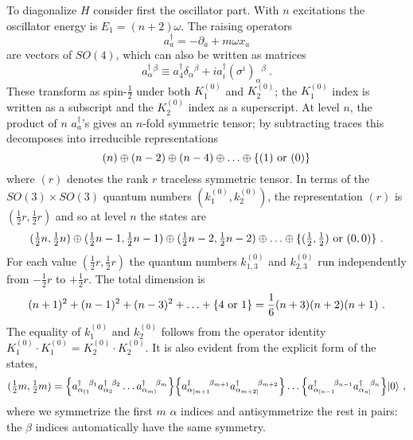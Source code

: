 \documentclass[a4paper,12pt]{article}
\newcommand{\half}{{\textstyle \frac{1}{2}}}
\begin{document}
To diagonalize $H$ consider first the oscillator part.  With $n$
excitations the oscillator energy is $E_1 = (n+2)\omega$.  The raising
operators
\begin{equation}
a_a^\dagger = -\partial_a + m\omega x_a
\end{equation}
are vectors of $SO(4)$, which can also be written as matrices
\begin{equation}
a^\dagger_{\alpha}\!^{\beta} \equiv a_4^\dagger
\delta_{\alpha}{}^{\beta} + i a_i^\dagger
(\sigma^i)_{\alpha}{}^{\beta}\ .
\end{equation}
These transform as spin-$\frac{1}{2}$ under both $K_1^{(0)}$ and
$K_2^{(0)}$; the $K_1^{(0)}$ index is written as a subscript and the
$K_2^{(0)}$ index as a superscript.  At level $n$, the product of $n$
$a_a^\dagger$'s gives an
$n$-fold symmetric tensor; by subtracting traces this  decomposes into
irreducible representations
\begin{equation}
(n) \oplus (n-2) \oplus (n-4) \oplus  \ldots \oplus \{ (1)\ {\rm or}\ (0)
\}
\end{equation}
where $(r)$ denotes the rank $r$ traceless symmetric tensor.  In terms of
the $SO(3) \times SO(3)$ quantum numbers $(k_1^{(0)}, k_2^{(0)})$, the
representation $(r)$ is $(\frac{1}{2}r,\frac{1}{2}r)$ and so at level $n$
the states are
\begin{equation}
(\half{n},\half{n}) \oplus
(\half{n}-1,\half{n}-1)\oplus
(\half{n}-2,\half{n}-2)\oplus
 \ldots \oplus
\{ 
(\half,\half)\ {\rm or}\ (0,0) \}\ .
\end{equation}
For each value $(\frac{1}{2}r,\frac{1}{2}r)$ the quantum numbers
$k^{(0)}_{1,3}$ and $k^{(0)}_{2,3}$ run independently from
$-\frac{1}{2}r$ to $+\frac{1}{2}r$.  The total dimension is
\begin{equation}
(n+1)^2 + (n-1)^2 + (n-3)^2 + \ldots + \{ 4\ {\rm or}\ 1\} =
\frac{1}{6}(n+3)(n+2)(n+1)\ .
\end{equation}
The equality of $k_1^{(0)}$ and $k_2^{(0)}$ follows from the
operator identity $K_1^{(0)} \cdot K_1^{(0)} = K_2^{(0)} \cdot
K_2^{(0)}$.  It is also evident from the explicit form of the states,
\begin{equation}
(\half{m},\half{m}) = \Bigl\{
a^\dagger_{\alpha_{(1}}\!^{\beta_1} 
a^\dagger_{\alpha_2}\!^{\beta_2} \ldots
a^\dagger_{\alpha_{m)}}\!^{\beta_m} \Bigr\}\Bigl\{
a^\dagger_{\alpha_{[m+1}}\!^{\beta_{m+1}} 
a^\dagger_{\alpha_{m+2]}}\!^{\beta_{m+2}} \Bigr\}
\ldots \Bigl\{
a^\dagger_{\alpha_{[n-1}}\!^{\beta_{n-1}}
a^\dagger_{\alpha_{n]}}\!^{\beta_{n}} \Bigr\}|0\rangle\ ,
\end{equation}
where we symmetrize the first $m$ $\alpha$ indices and antisymmetrize the
rest in pairs: the $\beta$ indices automatically have the same
symmetry.
\end{document}
